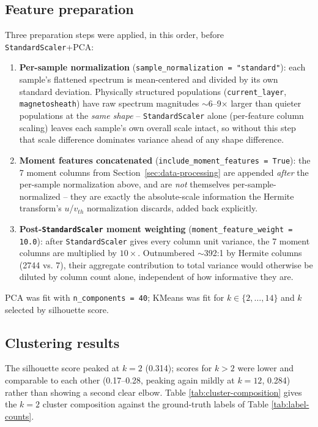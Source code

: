 \documentclass[11pt]{article}
\begin{document}
\subsection{Feature preparation}
\label{sec:pca-prep}
Three preparation steps were applied, in this order, before
\texttt{StandardScaler}+PCA:
\begin{enumerate}
  \item \textbf{Per-sample normalization} (\texttt{sample\_normalization
    = "standard"}): each sample's flattened spectrum is mean-centered
    and divided by its own standard deviation. Physically structured
    populations (\texttt{current\_layer}, \texttt{magnetosheath}) have
    raw spectrum magnitudes $\sim$6--9$\times$ larger than quieter
    populations at the \emph{same shape} -- \texttt{StandardScaler}
    alone (per-feature column scaling) leaves each sample's own overall
    scale intact, so without this step that scale difference dominates
    variance ahead of any shape difference.
  \item \textbf{Moment features concatenated} (\texttt{include\_moment\_features
    = True}): the 7 moment columns from
    Section~\ref{sec:data-processing} are appended \emph{after} the
    per-sample normalization above, and are \emph{not} themselves
    per-sample-normalized -- they are exactly the absolute-scale
    information the Hermite transform's $u$/$v_{th}$ normalization
    discards, added back explicitly.
  \item \textbf{Post-\texttt{StandardScaler} moment weighting}
    (\texttt{moment\_feature\_weight = 10.0}): after
    \texttt{StandardScaler} gives every column unit variance, the 7
    moment columns are multiplied by $10\times$. Outnumbered
    $\sim$392:1 by Hermite columns (2744 vs. 7), their aggregate
    contribution to total variance would otherwise be diluted by column
    count alone, independent of how informative they are.
\end{enumerate}
PCA was fit with \texttt{n\_components = 40}; KMeans was fit for
$k \in \{2, \dots, 14\}$ and $k$ selected by silhouette score.

\subsection{Clustering results}
The silhouette score peaked at $k=2$ (0.314); scores for $k>2$ were
lower and comparable to each other (0.17--0.28, peaking again mildly at
$k=12$, 0.284) rather than showing a second clear elbow. Table
\ref{tab:cluster-composition} gives the $k=2$ cluster composition
against the ground-truth labels of Table \ref{tab:label-counts}.
\end{document}
